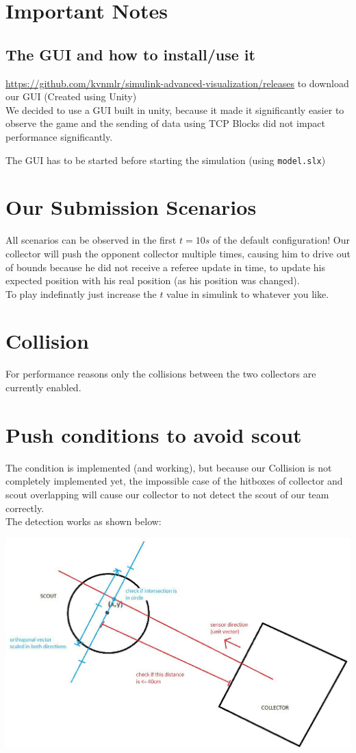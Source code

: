 \documentclass[12pt]{article}
\begin{document}
\lstset{language=C++}

\section*{Important Notes}

\subsection*{The GUI and how to install/use it}
\url{https://github.com/kvnmlr/simulink-advanced-visualization/releases}
to download our GUI (Created using Unity)\\

We decided to use a GUI built in unity, because it made it significantly easier to observe the game and the sending of data using TCP Blocks did not impact performance significantly.

The GUI has to be started before starting the simulation (using \verb!model.slx!)

\section*{Our Submission Scenarios}
All scenarios can be observed in the first $t=10s$ of the default configuration! Our collector will push the opponent collector multiple times, causing him to drive out of bounds because he did not receive a referee update in time, to update his expected position with his real position (as his position was changed).\\

To play indefinatly just increase the $t$ value in simulink to whatever you like.

\section*{Collision}
For performance reasons only the collisions between the two collectors are currently enabled.

\section*{Push conditions to avoid scout}
The condition is implemented (and working), but because our Collision is not completely implemented yet, the impossible case of the hitboxes of collector and scout overlapping will cause our collector to not detect the scout of our team correctly.\\

The detection works as shown below:\\
\begin{center}
\includegraphics[scale = 0.4]{pictures/scout_condition}
\end{center}
\end{document}
